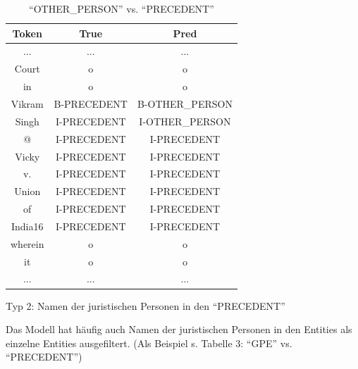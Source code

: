 \documentclass[paper=A4, ngerman, fontsize=12pt]{article}
\begin{document}
\begin{table}
	\begin{center}
		\begin{tabular}{@{}| c | c c | @{}}
			\toprule
			Token & True& Pred   \\ \midrule
			\hline
			... & ... & ... \\ \midrule
			Court & o & o \\   \midrule
			in & o & o \\   \midrule
			Vikram & B-PRECEDENT & B-OTHER\_PERSON  \\  \midrule
			Singh &  I-PRECEDENT & I-OTHER\_PERSON  \\   \midrule
			@ &  I-PRECEDENT& I-PRECEDENT \\   \midrule
			Vicky & I-PRECEDENT & I-PRECEDENT \\  \midrule
			v. &  I-PRECEDENT & I-PRECEDENT \\   \midrule
			Union & I-PRECEDENT  & I-PRECEDENT \\   \midrule
			of & I-PRECEDENT  & I-PRECEDENT \\  \midrule
			India16 & I-PRECEDENT  &  I-PRECEDENT  \\   \midrule
			wherein & o & o \\   \midrule
			it & o & o \\ \midrule
			... & ... & ... \\ \bottomrule
		\end{tabular}
		\caption{ \enquote{OTHER\_PERSON} vs. \enquote{PRECEDENT} }
	\end{center}
\end{table}


	\medskip
	\indent
	Typ 2: Namen der juristischen Personen in den \enquote{PRECEDENT}
	
	\indent
	Das Modell hat häufig auch Namen der juristischen Personen in den Entities als einzelne Entities ausgefiltert. (Als Beispiel s. Tabelle 3: \enquote{GPE} vs. \enquote{PRECEDENT}) 
	
\end{document}
